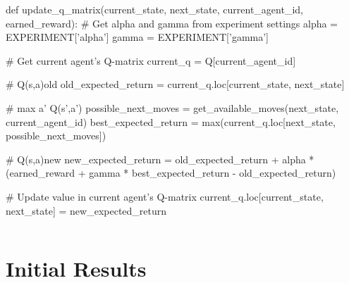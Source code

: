 \documentclass[10pt]{article}
\begin{document}
\onecolumn
    \begin{python}
def update_q_matrix(current_state, next_state, current_agent_id, earned_reward):
    # Get alpha and gamma from experiment settings
    alpha = EXPERIMENT['alpha']
    gamma = EXPERIMENT['gamma']

    # Get current agent's Q-matrix
    current_q = Q[current_agent_id]

    # Q(s,a)old
    old_expected_return = current_q.loc[current_state, next_state]

    # max a' Q(s',a')
    possible_next_moves = get_available_moves(next_state, current_agent_id)
    best_expected_return = max(current_q.loc[next_state, possible_next_moves])

    # Q(s,a)new
    new_expected_return = old_expected_return + alpha * (earned_reward + gamma * best_expected_return - old_expected_return)

    # Update value in current agent's Q-matrix
    current_q.loc[current_state, next_state] = new_expected_return
    \end{python}
    \begin{lstlisting}[caption=Implementation code for Q-Matrix Update, label=lst:q_update_code]
    \end{lstlisting}

\section{Initial Results}
\end{document}
